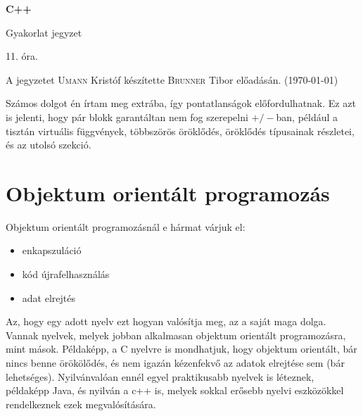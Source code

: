 \documentclass[a4paper,11.5pt]{article}
\begin{document}
	\setlength\parindent{0pt}
	\def\s{\hspace{0.2mm}\vphantom{\beta}}
	\def\Z{\mathbb{Z}}
	\def\Q{\mathbb{Q}}
	\def\R{\mathbb{R}}
	\def\C{\mathbb{C}}
	\def\N{\mathbb{N}}
	\def\Ra{\overline{\mathbb{R}}}
	
	\def\sume{\displaystyle\sum_{n=1}^{+\infty}}
	\def\sumn{\displaystyle\sum_{n=0}^{+\infty}}
	
	\def\narrow{\underset{n\rightarrow+\infty}{\longrightarrow}}
	\def\limn{\displaystyle\lim_{n\to +\infty}}
	\def\limx{\displaystyle\lim_{x\to +\infty}}
	
	\theoremstyle{definition}
	\newtheorem{theorem}{Tétel}[subsection] 
	
	\theoremstyle{definition}
	\newtheorem{definition}[theorem]{Definíció} 
	\newtheorem{example}[theorem]{Példa} 
	\newtheorem{task}[theorem]{Feladat} 
	\newtheorem{note}[theorem]{Megjegyzés}
	\begin{center}
		{\LARGE\textbf{C++}}
		
		{\Large Gyakorlat jegyzet}
		
		11. óra.
	\end{center}
	A jegyzetet \textsc{Umann} Kristóf készítette \textsc{Brunner} Tibor  előadásán. (\today)
	\medskip
	
	Számos dolgot én írtam meg extrába, így pontatlanságok előfordulhatnak. Ez azt is jelenti, hogy pár blokk garantáltan nem fog szerepelni $+/-$ban, például a tisztán virtuális függvények, többszörös öröklődés, öröklődés típusainak részletei, és az utolsó szekció.
	\section{Objektum orientált programozás}
	Objektum orientált programozásnál e hármat várjuk el:
	\begin{itemize}
		\item enkapszuláció
		\item kód újrafelhasználás
		\item adat elrejtés
	\end{itemize}
	Az, hogy egy adott nyelv ezt hogyan valósítja meg, az a saját maga dolga. Vannak nyelvek, melyek jobban alkalmasan objektum orientált programozásra, mint mások. Példaképp, a C nyelvre is mondhatjuk, hogy objektum orientált, bár nincs benne örökölődés, és nem igazán kézenfekvő az adatok elrejtése sem (bár lehetséges). Nyilvánvalóan ennél egyel praktikusabb nyelvek is léteznek, példaképp Java, és nyilván a c++ is, melyek sokkal erősebb nyelvi eszközökkel rendelkeznek ezek megvalósítására.
	
\end{document}
